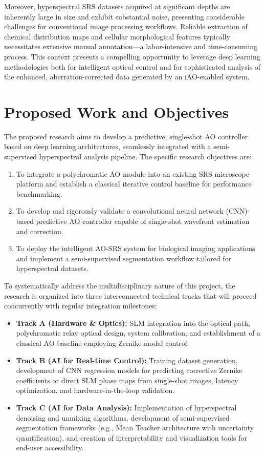 \documentclass[12pt,a4paper]{article}
\begin{document}
Moreover, hyperspectral SRS datasets acquired at significant depths are inherently large in size and exhibit substantial noise, presenting considerable challenges for conventional image processing workflows. Reliable extraction of chemical distribution maps and cellular morphological features typically necessitates extensive manual annotation—a labor-intensive and time-consuming process. This context presents a compelling opportunity to leverage deep learning methodologies both for intelligent optical control and for sophisticated analysis of the enhanced, aberration-corrected data generated by an iAO-enabled system.

\section{Proposed Work and Objectives}
The proposed research aims to develop a predictive, single-shot AO controller based on deep learning architectures, seamlessly integrated with a semi-supervised hyperspectral analysis pipeline. The specific research objectives are:
\begin{enumerate}
  \item To integrate a polychromatic AO module into an existing SRS microscope platform and establish a classical iterative control baseline for performance benchmarking.
  \item To develop and rigorously validate a convolutional neural network (CNN)-based predictive AO controller capable of single-shot wavefront estimation and correction.
  \item To deploy the intelligent AO-SRS system for biological imaging applications and implement a semi-supervised segmentation workflow tailored for hyperspectral datasets.
\end{enumerate}

To systematically address the multidisciplinary nature of this project, the research is organized into three interconnected technical tracks that will proceed concurrently with regular integration milestones:
\begin{itemize}
  \item \textbf{Track A (Hardware \& Optics):} SLM integration into the optical path, polychromatic relay optical design, system calibration, and establishment of a classical AO baseline employing Zernike modal control.
  \item \textbf{Track B (AI for Real-time Control):} Training dataset generation, development of CNN regression models for predicting corrective Zernike coefficients or direct SLM phase maps from single-shot images, latency optimization, and hardware-in-the-loop validation.
  \item \textbf{Track C (AI for Data Analysis):} Implementation of hyperspectral denoising and unmixing algorithms, development of semi-supervised segmentation frameworks (e.g., Mean Teacher architecture with uncertainty quantification), and creation of interpretability and visualization tools for end-user accessibility.
\end{itemize}
\end{document}
